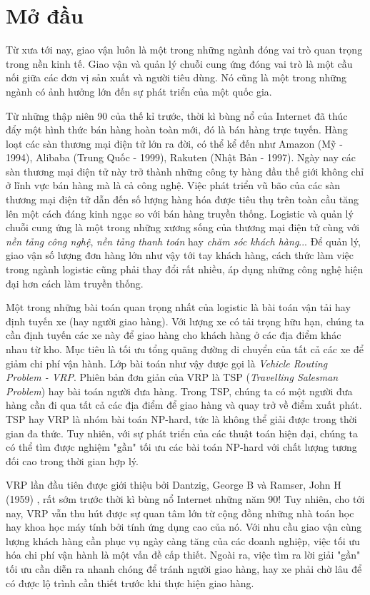 \chapter{Mở đầu}
\label{chap:introduction}

Từ xưa tới nay, giao vận luôn là một trong những ngành đóng vai trò quan trọng trong nền kinh tế. Giao vận và quản lý chuỗi cung ứng đóng vai trò là một cầu nối giữa các đơn vị sản xuất và người tiêu dùng. Nó cũng là một trong những ngành có ảnh hưởng lớn đến sự phát triển của một quốc gia. 

Từ những thập niên 90 của thế kỉ trước, thời kì bùng nổ của Internet đã thúc đẩy một hình thức bán hàng hoàn toàn mới, đó là bán hàng trực tuyến. Hàng loạt các sàn thương mại điện tử lớn ra đời, có thể kể đến như Amazon (Mỹ - 1994), Alibaba (Trung Quốc - 1999), Rakuten (Nhật Bản - 1997). Ngày nay các sàn thương mại điện tử này trở thành những công ty hàng đầu thế giới không chỉ ở lĩnh vực bán hàng mà là cả công nghệ. Việc phát triển vũ bão của các sàn thương mại điện tử dẫn đến số lượng hàng hóa được tiêu thụ trên toàn cầu tăng lên một cách đáng kinh ngạc so với bán hàng truyền thống. Logistic và quản lý chuỗi cung ứng là một trong những xương sống của thương mại điện tử cùng với \textit{nền tảng công nghệ}, \textit{nền tảng thanh toán} hay \textit{chăm sóc khách hàng}... Để quản lý, giao vận số lượng đơn hàng lớn như vậy tới tay khách hàng, cách thức làm việc trong ngành logistic cũng phải thay đổi rất nhiều, áp dụng những công nghệ hiện đại hơn cách làm truyền thống.

Một trong những bài toán quan trọng nhất của logistic là bài toán vận tải hay định tuyến xe (hay người giao hàng). Với lượng xe có tải trọng hữu hạn, chúng ta cần định tuyến các xe này để giao hàng cho khách hàng ở các địa điểm khác nhau từ kho. Mục tiêu là tối ưu tổng quãng đường di chuyển của tất cả các xe để giảm chi phí vận hành. Lớp bài toán như vậy được gọi là \textit{Vehicle Routing Problem - VRP}. Phiên bản đơn giản của VRP là TSP (\textit{Travelling Salesman Problem}) hay bài toán người đưa hàng. Trong TSP, chúng ta có một người đưa hàng cần đi qua tất cả các địa điểm để giao hàng và quay trở về điểm xuất phát. TSP hay VRP là nhóm bài toán NP-hard, tức là không thể giải được trong thời gian đa thức. Tuy nhiên, với sự phát triển của các thuật toán hiện đại, chúng ta có thể tìm được nghiệm "gần" tối ưu các bài toán NP-hard với chất lượng tương đối cao trong thời gian hợp lý.

VRP lần đầu tiên được giới thiệu bởi Dantzig, George B và Ramser, John H (1959) \cite{dantzig1959truck}, rất sớm trước thời kì bùng nổ Internet những năm 90! Tuy nhiên, cho tới nay, VRP vẫn thu hút được sự quan tâm lớn từ cộng đồng những nhà toán học hay khoa học máy tính bởi tính ứng dụng cao của nó. Với nhu cầu giao vận cùng lượng khách hàng cần phục vụ ngày càng tăng của các doanh nghiệp, việc tối ưu hóa chi phí vận hành là một vấn đề cấp thiết. Ngoài ra, việc tìm ra lời giải "gần" tối ưu cần diễn ra nhanh chóng để tránh người giao hàng, hay xe phải chờ lâu để có được lộ trình cần thiết trước khi thực hiện giao hàng. 

